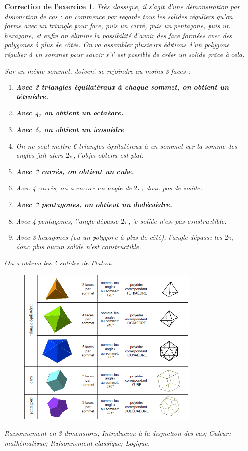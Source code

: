 \documentclass[12pt]{article}
\theoremstyle{break}
\newtheorem{cor}{Correction de l'exercice}
\begin{document}
\begin{cor}
Très classique, il s'agit d'une démonstration par disjonction de cas : on commence par regarde tous les solides réguliers qu'on forme avec un triangle pour face, puis un carré, puis un pentagone, puis un hexagone, et enfin on élimine la possibilité d'avoir des face formées avec des polygones à plus de côtés. On va assembler plusieurs éditions d'un polygone régulier à un sommet pour savoir s'il est possible de créer un solide grâce à cela.

Sur un même sommet, doivent se rejoindre au moins 3 faces :
\begin{enumerate}
\item \textbf{Avec 3 triangles équilatéraux à chaque sommet, on obtient un tétraèdre.}
\item \textbf{Avec 4, on obtient un octaèdre.}
\item \textbf{Avec 5, on obtient un icosaèdre}
\item On ne peut mettre 6 triangles équilatéraux à un sommet car la somme des angles fait alors $2\pi$, l'objet obtenu est plat.
\item \textbf{Avec 3 carrés, on obtient un cube.}
\item Avec 4 carrés, on a encore un angle de $2\pi$, donc pas de solide.
\item \textbf{Avec 3 pentagones, on obtient un dodécaèdre.}
\item Avec 4 pentagones, l'angle dépasse $2\pi$, le solide n'est pas constructible.
\item Avec 3 hexagones (ou un polygone à plus de côté), l'angle dépasse les $2\pi$, donc plus aucun solide n'est constructible.
\end{enumerate}

On a obtenu les 5 solides de Platon.\newline

\begin{figure}[h!]
	\centering
    \includegraphics[width=0.8\textwidth]{images/PolyedreSolution.jpg}  
\end{figure}

\textit{Raisonnement en 3 dimensions; Introducion à la disjnction des cas; Culture mathématique; Raisonnement classique; Logique.}

\end{cor}
\end{document}
